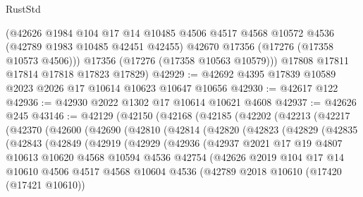 \begin{lexlean}{RustStd}
\begin{coremodule}
        (@42626
          @1984
          @104
          @17
          @14
          @10485
          @4506
          @4517
          @4568
          @10572
          @4536
          (@42789 @1983 @10485 @42451 @42455)
          @42670
          @17356
          (@17276 (@17358 @10573 @4506)))
        @17356
        (@17276 (@17358 @10563 @10579)))
      @17808
      @17811
      @17814
      @17818
      @17823
      @17829)
@42929 := @42692 @4395 @17839 @10589 @2023 @2026 @17 @10614 @10623 @10647 @10656
@42930 := @42617 @122
@42936 := @42930 @2022 @1302 @17 @10614 @10621 @4608
@42937 := @42626 @245
@43146 := @42129
    (@42150
      (@42168
        (@42185
          (@42202
            (@42213
              (@42217
                (@42370
                  (@42600
                    (@42690
                      (@42810
                        (@42814
                          (@42820
                            (@42823
                              (@42829
                                (@42835
                                  (@42843
                                    (@42849
                                      (@42919
                                        (@42929
                                          (@42936
                                            (@42937
                                              @2021
                                              @17
                                              @19
                                              @4807
                                              @10613
                                              @10620
                                              @4568
                                              @10594
                                              @4536
                                              @42754
                                              (@42626
                                                @2019
                                                @104
                                                @17
                                                @14
                                                @10610
                                                @4506
                                                @4517
                                                @4568
                                                @10604
                                                @4536
                                                (@42789
                                                  @2018
                                                  @10610
                                                  (@17420 (@17421 @10610))

\end{coremodule}
\end{lexlean}
